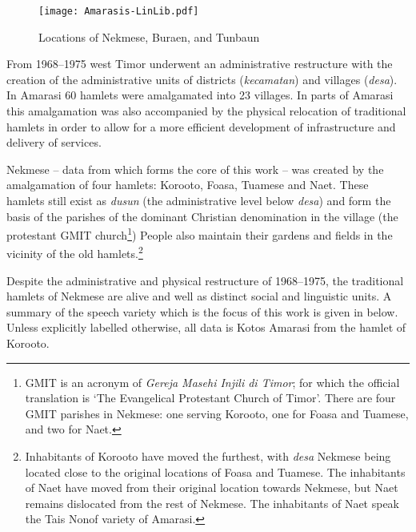 \begin{figure}[ht]
	\caption{Locations of Nekmese{\Q}, Buraen, and Tunbaun}\label{fig:LocNekBurTun}
	\texttt{[image: Amarasis-LinLib.pdf]}
\end{figure}

From 1968--1975 west Timor underwent an administrative restructure
with the creation of the administrative units of districts
(\emph{kecamatan}) and villages (\emph{desa}).
In Amarasi 60 hamlets were amalgamated into 23 villages.
In parts of Amarasi this amalgamation was also accompanied by the 
physical relocation of traditional hamlets in order to allow
for a more efficient development of infrastructure and delivery of services.

Nekmese{\Q} -- data from which forms the core of this work --
was created by the amalgamation of four hamlets:
Koro{\Q}oto, Fo{\Q}asa{\Q}, Tuamese{\Q} and Naet.
These hamlets still exist as \emph{dusun}
(the administrative level below \emph{desa})
and form the basis of the parishes of the dominant
Christian denomination in the village
(the protestant GMIT church\footnote{
		GMIT is an acronym of \emph{Gereja Masehi Injili di Timor};
		for which the official translation is `The Evangelical Protestant Church of Timor'.
		There are four GMIT parishes in Nekmese{\Q}:
		one serving Koro{\Q}oto, one for Fo{\Q}asa{\Q} and Tuamese{\Q}, and two for Naet.})
People also maintain their gardens and fields in the vicinity of the old hamlets.\footnote{
		Inhabitants of Koro{\Q}oto have moved the furthest,
		with \emph{desa} Nekmese{\Q} being located close to the original locations
		of Fo{\Q}asa{\Q} and Tuamese{\Q}.
		The inhabitants of Naet have moved from their original location
		towards Nekmese{\Q}, but Naet remains dislocated from the rest of Nekmese{\Q}.
		The inhabitants of Naet speak the Tais Nonof variety of Amarasi.}

Despite the administrative and physical restructure of 1968--1975,
the traditional hamlets of Nekmese{\Q} are alive and well as distinct social and linguistic units.
A summary of the speech variety which is the focus of this work is given in  below.
Unless explicitly labelled otherwise,
all data is Kotos Amarasi from the hamlet of Koro{\Q}oto.

\begin{exe}
	\label{ex:SpeVar}
\end{exe}

